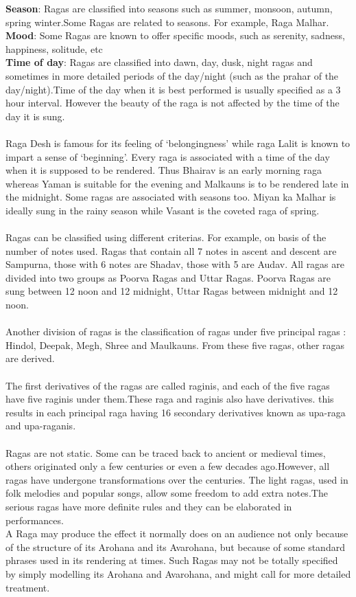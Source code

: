 \documentclass[12pt,a4paper]{article}
\begin{document}
{\textbf{Season}}: Ragas are classified into seasons such as summer, monsoon, autumn, spring winter.Some Ragas are related to seasons. For example, Raga Malhar.\\
{\textbf{Mood}}: Some Ragas are known to offer specific moods, such as serenity, sadness, happiness, solitude, etc\\
{\textbf{Time of day}}: Ragas are classified into dawn, day, dusk, night ragas and sometimes in more detailed periods of the day/night (such as the prahar of the day/night).Time of the  day when it is best performed is usually specified as a 3 hour interval. However the beauty of the raga is not affected by the time of the day it is sung.
\paragraph{}
Raga Desh is famous for its feeling of ‘belongingness’ while raga Lalit is known to impart a sense of ‘beginning’. Every raga is associated  with a time of the day when it is supposed to be rendered. Thus Bhairav is an early morning raga whereas Yaman is suitable for the evening and Malkauns is to be rendered late in the midnight. Some ragas are associated with seasons too. Miyan ka Malhar is ideally sung in the rainy season while Vasant is the coveted raga of spring. 
	 		\\ \\
Ragas can be classified using different criterias. For example, on basis of the number of notes used. Ragas that contain all 7 notes in ascent and descent are Sampurna, those with 6 notes are Shadav, those with 5 are Audav.
All ragas are divided into two groups as Poorva Ragas and Uttar Ragas.
Poorva Ragas are sung between 12 noon and 12 midnight, Uttar Ragas between midnight and 12 noon.
				\\ \\	
Another division of ragas is the classification of ragas under five principal ragas : Hindol, Deepak, Megh, Shree and Maulkauns. From these five ragas, other ragas are derived. 
\\ \\ 
The first derivatives of the ragas are called raginis, and each of the five ragas have five raginis under them.These raga and raginis also have derivatives. this results in each principal raga having 16 secondary derivatives known as upa-raga and upa-raganis.
		\paragraph{}								
Ragas are not static. Some can be traced back to ancient or medieval times, others originated only a few centuries or even a few decades ago.However, all ragas have undergone transformations over the centuries. The light ragas, used in folk melodies and popular songs, allow some freedom to add extra notes.The serious ragas have more definite rules and they can be elaborated in performances. 
	\\
A Raga may produce the effect it normally does on an audience not only because of the structure of its Arohana and its Avarohana, but because of some standard phrases used in its rendering at times. Such Ragas may not be totally specified by simply modelling its Arohana and Avarohana, and might call for more detailed treatment.	
\end{document}
